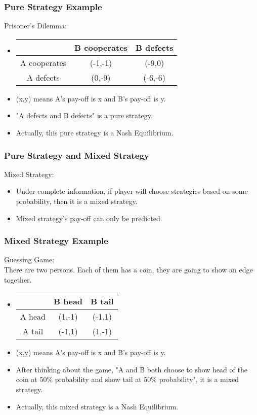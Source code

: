 \documentclass{beamer}
\begin{document}
\begin{frame}
\frametitle{Pure Strategy Example}
Prisoner's Dilemma:
\begin{itemize}
\item
\begin{tabular}{|c|c|c|}
\hline
\hline
    & B cooperates & B defects\\
\hline
A cooperates & (-1,-1) & (-9,0)\\
\hline
A defects & (0,-9) & (-6,-6)\\
\hline
\hline
\end{tabular}
\item
(x,y) means A's pay-off is x and B's pay-off is y.\\
\item "A defects and B defects" is a pure strategy.\\
\item Actually, this pure strategy is a Nash Equilibrium.
\end{itemize}
\end{frame}

\begin{frame}
\frametitle{Pure Strategy and Mixed Strategy}
Mixed Strategy:\\
\begin{itemize}
\item Under complete information, if player will choose strategies based on some probability, then it is a mixed strategy.
\item Mixed strategy's pay-off can only be predicted.
\end{itemize}
\end{frame}

\begin{frame}
\frametitle{Mixed Strategy Example}
Guessing Game:\\
There are two persons. Each of them has a coin, they are going to show an edge together.\\
\begin{itemize}
\item
\begin{tabular}{|c|c|c|}
\hline
\hline
    & B head & B tail\\
\hline
A head & (1,-1) & (-1,1)\\
\hline
A tail & (-1,1) & (1,-1)\\
\hline
\hline
\end{tabular}
\item
(x,y) means A's pay-off is x and B's pay-off is y.\\
\item After thinking about the game, "A and B both choose to show head of the coin at 50\% probability and show tail at 50\% probability", it is a mixed strategy.
\item Actually, this mixed strategy is a Nash Equilibrium.
\end{itemize}
\end{frame}
\end{document}
